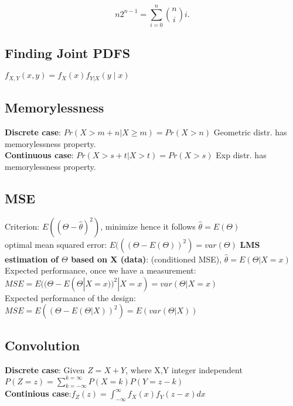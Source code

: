 $$n2^{n-1}=\sum _{i=0}^ n \binom {n}{i}i.$$

\subsection{Finding Joint PDFS}

$f_{X,Y}(x,y)=f_ X(x)f_{Y|X}(y\mid x)$

\subsection{Memorylessness}

\textbf{Discrete case}: $Pr(X > m+n | X \geq m) = Pr(X > n)$ 
Geometric distr. has memorylessness property.\\
\textbf{Continuous  case}: $Pr(X > s+t| X > t) = Pr(X > s)$ 
Exp distr. has memorylessness property.

\subsection{MSE}
Criterion: $E((\Theta - \hat{\theta})^2)$, minimize hence it follows $\hat{\theta} =E(\Theta)$\\
optimal mean squared error: $E(((\Theta - E(\Theta))^2)  = var(\Theta)$
\textbf{LMS estimation of $\Theta$ based on X (data)}: (conditioned MSE), $\hat{\theta} =E(\Theta |X=x)$ \\
Expected performance, once we have a measurement: $MSE = E( (\Theta - E(\Theta|X=x))^2 | X=x ) = var(\Theta|X=x)$\\
Expected performance of the design: $MSE = E( (\Theta - E(\Theta|X))^2 ) = E(var(\Theta|X))$

\subsection{Convolution}

\textbf{Discrete case}: Given $Z=X+Y$, where X,Y integer independent\\
$P(Z=z)= \sum_{k=-\infty}^{k=\infty}P(X=k)P(Y=z-k)$ \\
\textbf{Continious case}:$f_Z(z)=\int_{-\infty}^{\infty} f_X(x)f_Y(z-x) dx $
